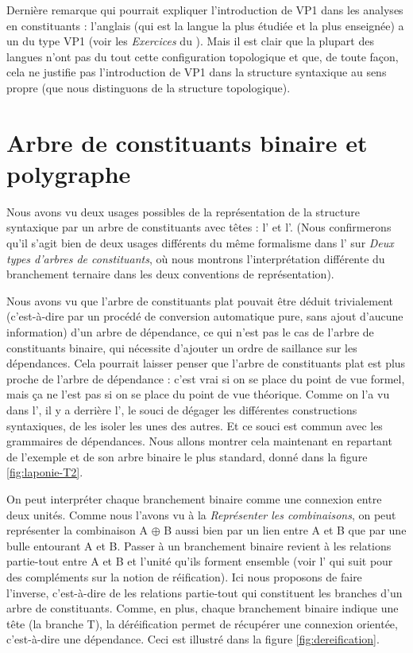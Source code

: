 {    Dernière remarque qui pourrait expliquer l’introduction de VP1 dans les analyses en constituants : l’anglais (qui est la langue la plus étudiée et la plus enseignée) a un  du type VP1 (voir les \textit{Exercices} du ). Mais il est clair que la plupart des langues n’ont pas du tout cette configuration topologique et que, de toute façon, cela ne justifie pas l’introduction de VP1 dans la structure syntaxique au sens propre (que nous distinguons de la structure topologique).
}
\section{Arbre de constituants binaire et polygraphe}\label{sec:3.4.21}

Nous avons vu deux usages possibles de la représentation de la structure syntaxique par un arbre de constituants avec têtes : l’ et l’. (Nous confirmerons qu’il s’agit bien de deux usages différents du même formalisme dans l’ sur \textit{Deux types d’arbres de constituants}, où nous montrons l’interprétation différente du branchement ternaire dans les deux conventions de représentation).

Nous avons vu que l’arbre de constituants plat pouvait être déduit trivialement (c’est-à-dire par un procédé de conversion automatique pure, sans ajout d’aucune information) d’un arbre de dépendance, ce qui n’est pas le cas de l’arbre de constituants binaire, qui nécessite d’ajouter un ordre de saillance sur les dépendances. Cela pourrait laisser penser que l’arbre de constituants plat est plus proche de l’arbre de dépendance : c’est vrai si on se place du point de vue formel, mais ça ne l’est pas si on se place du point de vue théorique. Comme on l’a vu dans l', il y a derrière l’, le souci de dégager les différentes constructions syntaxiques, de les isoler les unes des autres. Et ce souci est commun avec les grammaires de dépendances. Nous allons montrer cela maintenant en repartant de l'exemple  et de son arbre binaire le plus standard, donné dans la figure \ref{fig:laponie-T2}.

On peut interpréter chaque branchement binaire comme une connexion entre deux unités. Comme nous l’avons vu à la  \textit{Représenter les combinaisons}, on peut représenter la combinaison A ${\oplus}$ B aussi bien par un lien entre A et B que par une bulle entourant A et B. Passer à un branchement binaire revient à  les relations partie-tout entre A et B et l’unité qu’ils forment ensemble (voir l’ qui suit pour des compléments sur la notion de réification). Ici nous proposons de faire l’inverse, c’est-à-dire de  les relations partie-tout qui constituent les branches d’un arbre de constituants. Comme, en plus, chaque branchement binaire indique une tête (la branche T), la déréification permet de récupérer une connexion orientée, c’est-à-dire une dépendance. Ceci est illustré dans la figure \ref{fig:dereification}.


